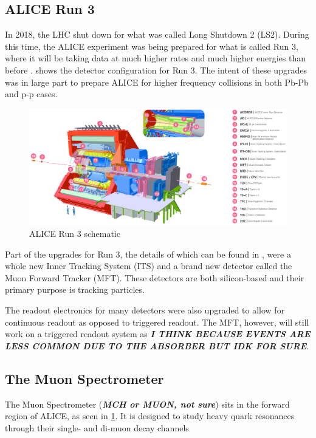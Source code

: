 \documentclass[11pt]{article}
\numberwithin{equation}{section}
\numberwithin{figure}{section}
\numberwithin{table}{section}
\begin{document}
\subsection{ALICE Run 3}
In 2018, the LHC shut down for what was called Long Shutdown 2 (LS2). During this time, the ALICE experiment was being prepared for what is called Run 3, where it will be taking data at much higher rates and much higher energies than before \cite{ALICE_Upgrade_LOI}.  shows the detector configuration for Run 3. The intent of these upgrades was in large part to prepare ALICE for higher frequency collisions in both Pb-Pb and p-p cases. 

\begin{figure}[h]
    \begin{center}
        \includegraphics[width=.8\textwidth]{Figs/ALICE_RUN3_schematic.png}
        \caption{ALICE Run 3 schematic}
        \label{fig:ALICE_Schematic}
    \end{center}
\end{figure}

Part of the upgrades for Run 3, the details of which can be found in \cite{ALICE_Upgrade_LOI}, were a whole new Inner Tracking System (ITS) and a brand new detector called the Muon Forward Tracker (MFT). These detectors are both silicon-based and their primary purpose is tracking particles. 

The readout electronics for many detectors were also upgraded to allow for continuous readout as opposed to triggered readout. The MFT, however, will still work on a triggered readout system as \textit{\textbf{I THINK BECAUSE EVENTS ARE LESS COMMON DUE TO THE ABSORBER BUT IDK FOR SURE}}.

\subsection{The Muon Spectrometer}
The Muon Spectrometer (\textit{\textbf{MCH or MUON, not sure}}) sits in the forward region of ALICE, as seen in \cref{fig:ALICE_Schematic}. It is designed to study heavy quark resonances through their single- and di-muon decay channels
\end{document}
